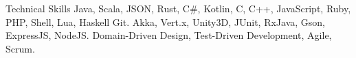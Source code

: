 
\begin{rubric}{Technical Skills}
	Java, Scala, JSON, Rust, C\#, Kotlin, C, C++, JavaScript, Ruby, PHP, Shell, Lua, Haskell
	Git.
	Akka, Vert.x, Unity3D, JUnit, RxJava, Gson, ExpressJS, NodeJS.
	Domain-Driven Design, Test-Driven Development, Agile, Scrum.
\end{rubric}
